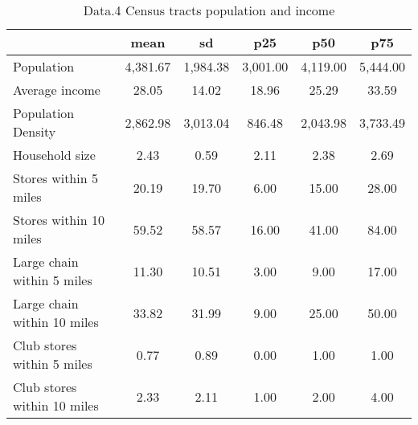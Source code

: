 \begin{table}[htbp]
\caption{\label{clabel} Data.4 Census tracts population and income}\centering\medskip
\begin{tabular}{lccccc} \hline \hline
 & mean  & sd  & p25  & p50  & p75  \\  \hline 
Population &     4,381.67 &     1,984.38 &     3,001.00 &     4,119.00 &     5,444.00 \\  
Average income &        28.05 &        14.02 &        18.96 &        25.29 &        33.59 \\  
Population Density &     2,862.98 &     3,013.04 &       846.48 &     2,043.98 &     3,733.49 \\  
Household size &         2.43 &         0.59 &         2.11 &         2.38 &         2.69 \\  
Stores within 5 miles &        20.19 &        19.70 &         6.00 &        15.00 &        28.00 \\  
Stores within 10 miles &        59.52 &        58.57 &        16.00 &        41.00 &        84.00 \\  
Large chain within 5 miles &        11.30 &        10.51 &         3.00 &         9.00 &        17.00 \\  
Large chain within 10 miles &        33.82 &        31.99 &         9.00 &        25.00 &        50.00 \\  
Club stores within 5 miles &         0.77 &         0.89 &         0.00 &         1.00 &         1.00 \\  
Club stores within 10 miles &         2.33 &         2.11 &         1.00 &         2.00 &         4.00 \\  
\hline \hline \end{tabular}
\end{table}
